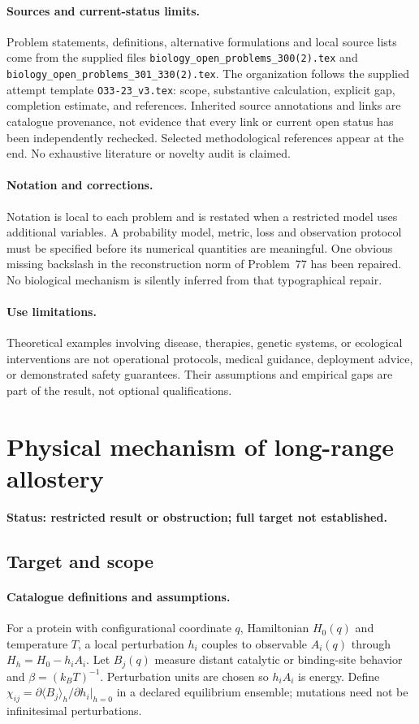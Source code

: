 \documentclass[11pt]{article}
\begin{document}
\paragraph{Sources and current-status limits.}
Problem statements, definitions, alternative formulations and local source lists
come from the supplied files
\texttt{biology\_open\_problems\_300(2).tex} and
\texttt{biology\_open\_problems\_301\_330(2).tex}.
The organization follows the supplied attempt template
\texttt{O33-23\_v3.tex}: scope, substantive calculation, explicit gap,
completion estimate, and references. Inherited source annotations and links are
catalogue provenance, not evidence that every link or current open status has
been independently rechecked. Selected methodological references appear at the
end. No exhaustive literature or novelty audit is claimed.

\paragraph{Notation and corrections.}
Notation is local to each problem and is restated when a restricted model uses
additional variables. A probability model, metric, loss and observation protocol
must be specified before its numerical quantities are meaningful. One obvious
missing backslash in the reconstruction norm of Problem~77 has been repaired.
No biological mechanism is silently inferred from that typographical repair.

\paragraph{Use limitations.}
Theoretical examples involving disease, therapies, genetic systems, or ecological
interventions are not operational protocols, medical guidance, deployment advice,
or demonstrated safety guarantees. Their assumptions and empirical gaps are part
of the result, not optional qualifications.


\section*{Physical mechanism of long-range allostery}
\label{prob:082}
\noindent\textbf{Status: restricted result or obstruction; full target not established.}
\subsection{Target and scope}
\paragraph{Catalogue definitions and assumptions.}
For a protein with configurational coordinate $q$, Hamiltonian $H_0(q)$ and temperature $T$, a local perturbation $h_i$ couples to observable $A_i(q)$ through $H_h=H_0-h_iA_i$. Let $B_j(q)$ measure distant catalytic or binding-site behavior and $\beta=(k_BT)^{-1}$. Perturbation units are chosen so $h_iA_i$ is energy. Define $\chi_{ij}=\partial\langle B_j\rangle_h/\partial h_i|_{h=0}$ in a declared equilibrium ensemble; mutations need not be infinitesimal perturbations.
\end{document}
